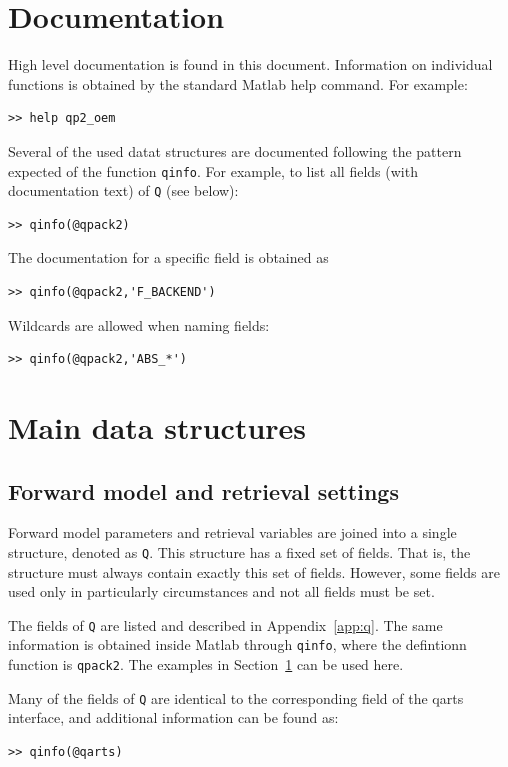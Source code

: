 \documentclass[a4paper,11pt]{article}
\begin{document}
\section{Documentation}
\label{sec:doc}

High level documentation is found in this document. Information on
individual functions is obtained by the standard Matlab help
command. For example:
\begin{verbatim}
>> help qp2_oem
\end{verbatim}
Several of the used datat structures are documented following the
pattern expected of the function \verb|qinfo|. For example, to list
all fields (with documentation text) of \verb|Q| (see below):
\begin{verbatim}
>> qinfo(@qpack2)
\end{verbatim}
The documentation for a specific field is obtained as
\begin{verbatim}
>> qinfo(@qpack2,'F_BACKEND')
\end{verbatim}
Wildcards are allowed when naming fields:
\begin{verbatim}
>> qinfo(@qpack2,'ABS_*')
\end{verbatim}


\section{Main data structures}

\subsection{Forward model and retrieval settings}
\label{sec:Q}
Forward model parameters and retrieval variables are joined into a
single structure, denoted as \verb|Q|. This structure has a fixed set
of fields. That is, the structure must always contain exactly this set
of fields. However, some fields are used only in particularly
circumstances and not all fields must be set.

The fields of \verb|Q| are listed and described in
Appendix~\ref{app:q}. The same information is obtained inside Matlab
through \verb|qinfo|, where the defintionn function is
\verb|qpack2|. The examples in Section~\ref{sec:doc} can be used here.

Many of the fields of \verb|Q| are identical to the corresponding
field of the qarts interface, and additional information can be found
as:
\begin{verbatim}
>> qinfo(@qarts)
\end{verbatim}
\end{document}
